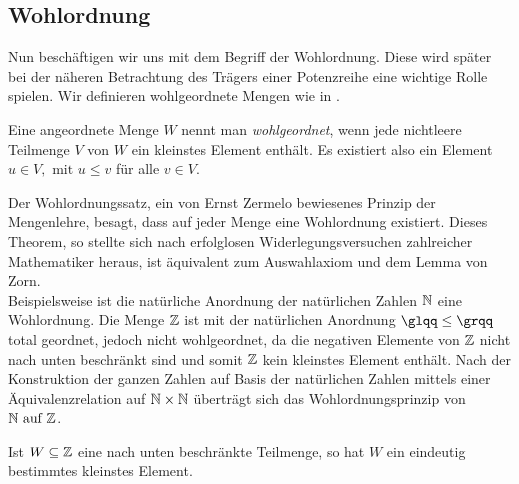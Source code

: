 \subsection{Wohlordnung}
Nun beschäftigen wir uns mit dem Begriff der Wohlordnung. Diese wird später bei der näheren Betrachtung des Trägers einer Potenzreihe eine wichtige Rolle spielen. Wir definieren wohlgeordnete Mengen wie in \cite[S. 16]{fuchs66}.
\begin{defn} \label{wohlgeordn} %
Eine angeordnete Menge $W$ nennt man \textit{wohlgeordnet}, wenn jede nichtleere Teilmenge $V$ von $W$ ein kleinstes Element enthält. Es existiert also ein Element $ u \in V, \text{ mit } u \le v $ für alle $ v \in V.$ 
\end{defn}
%
Der Wohlordnungssatz, ein von Ernst Zermelo bewiesenes Prinzip der Mengenlehre, besagt, dass auf jeder Menge eine Wohlordnung existiert. Dieses Theorem, so stellte sich nach erfolglosen Widerlegungsversuchen zahlreicher Mathematiker heraus, ist äquivalent zum Auswahlaxiom und dem Lemma von Zorn. \\
Beispielsweise ist die natürliche Anordnung der natürlichen Zahlen $\mathbb{N}$ eine Wohlordnung. Die Menge $\mathbb{Z}$ ist mit der natürlichen Anordnung $\glqq\leq\grqq$ total geordnet, jedoch nicht wohlgeordnet, da die negativen Elemente von $\mathbb{Z}$ nicht nach unten beschränkt sind und somit $\mathbb{Z}$ kein kleinstes Element enthält. Nach der Konstruktion der ganzen Zahlen auf Basis der natürlichen Zahlen mittels einer Äquivalenzrelation auf $\mathbb{N} \times \mathbb{N}$  überträgt sich das Wohlordnungsprinzip von $\mathbb{N} \text{ auf } \mathbb{Z}$.
\begin{bem} %
Ist $W \subseteq \mathbb{Z}$ eine nach unten beschränkte Teilmenge, so hat $W$ ein eindeutig bestimmtes kleinstes Element. 
\end{bem} 

